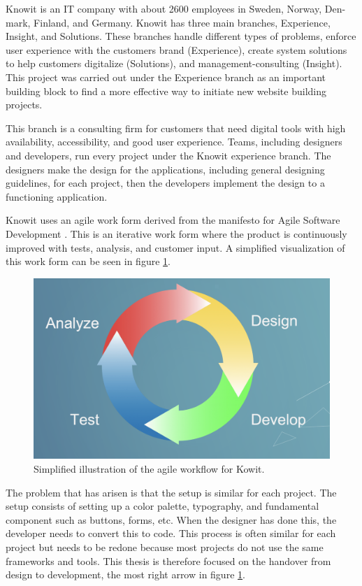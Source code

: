 Knowit is an IT company with about 2600 employees in Sweden, Norway, Den- mark, Finland, and Germany. Knowit has three main branches, Experience, Insight, and Solutions. These branches handle different types of problems, enforce user experience with the customers brand (Experience), create system solutions to help customers digitalize (Solutions), and management-consulting (Insight). This project was carried out under the Experience branch as an important building block to find a more effective way to initiate new website building projects. 

This branch is a consulting firm for customers that need digital tools with high availability, accessibility, and good user experience. Teams, including designers and developers, run every project under the Knowit experience branch. The designers make the design for the applications, including general designing guidelines, for each project, then the developers implement the design to a functioning application. 

Knowit uses an agile work form derived from the manifesto for Agile Software Development \cite{ManifestoAgileSoftware}. This is an iterative work form where the product is continuously improved with tests, analysis, and customer input. A simplified visualization of this work form can be seen in figure \ref{fig:agile}.

\begin{figure}[H]
  \centering
  \includegraphics[width=0.8\linewidth]{images/agile.png}
  \caption{Simplified illustration of the agile workflow for Kowit.}%
  \label{fig:agile}
\end{figure}

The problem that has arisen is that the setup is similar for each project. The setup consists of setting up a color palette, typography, and fundamental \gls{component} such as buttons, forms, etc. When the designer has done this, the developer needs to convert this to code. This process is often similar for each project but needs to be redone because most projects do not use the same frameworks and tools. This thesis is therefore focused on the handover from design to development, the most right arrow in figure \ref{fig:agile}.

